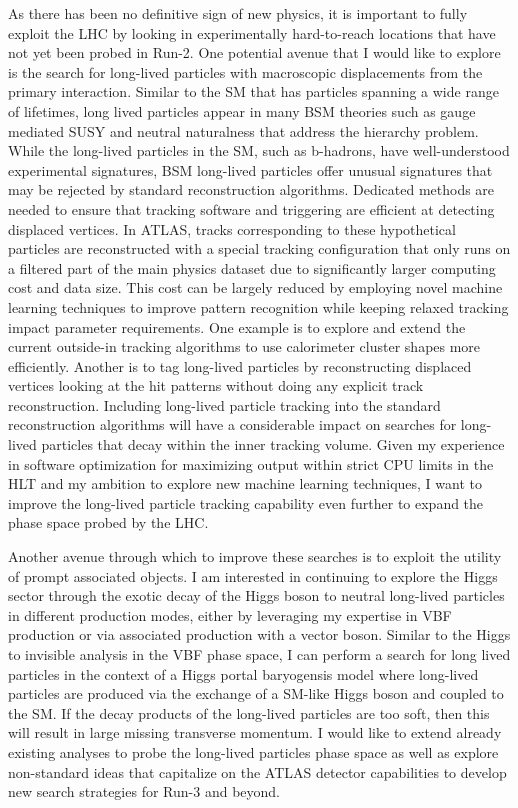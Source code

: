 \documentclass[a4paper]{article}
\begin{document}
As there has been no definitive sign of new physics, it is important to fully exploit the LHC by looking in experimentally hard-to-reach locations that have not yet been probed in Run-2. One potential avenue that I would like to explore is the search for long-lived particles with macroscopic displacements from the primary interaction. Similar to the SM that has particles spanning a wide range of lifetimes, long lived particles appear in many BSM theories such as gauge mediated SUSY and neutral naturalness that address the hierarchy problem\cite{alimena2019searching}. While the long-lived particles in the SM, such as b-hadrons, have well-understood experimental signatures, BSM long-lived particles offer unusual signatures that may be rejected by standard reconstruction algorithms. Dedicated methods are needed to ensure that tracking software and triggering are efficient at detecting displaced vertices. In ATLAS, tracks corresponding to these hypothetical particles are reconstructed with a special tracking configuration that only runs on a filtered part of the main physics dataset due to significantly larger computing cost and data size. This cost can be largely reduced by employing novel machine learning techniques to improve pattern recognition while keeping relaxed tracking impact parameter requirements. One example is to explore and extend the current outside-in tracking algorithms to use calorimeter cluster shapes more efficiently. Another is to tag long-lived particles by reconstructing displaced vertices looking at the hit patterns without doing any explicit track reconstruction. Including long-lived particle tracking into the standard reconstruction algorithms will have a considerable impact on searches for long-lived particles that decay within the inner tracking volume. Given my experience in software optimization for maximizing output within strict CPU limits in the HLT and my ambition to explore new machine learning techniques, I want to improve the long-lived particle tracking capability even further to expand the phase space probed by the LHC.




\bigskip


Another avenue through which to improve these searches is to exploit the utility of prompt associated objects. I am interested in continuing to explore the Higgs sector through the exotic decay of the Higgs boson to neutral long-lived particles in different production modes, either by leveraging my expertise in VBF production or via associated production with a vector boson. Similar to the Higgs to invisible analysis in the VBF phase space, I can perform a search for long lived particles in the context of a Higgs portal baryogensis model where long-lived particles are produced via the exchange of a SM-like Higgs boson and coupled to the SM. If the decay products of the long-lived particles are too soft, then this will result in large missing transverse momentum. I would like to extend already existing analyses to probe the long-lived particles phase space as well as explore non-standard ideas that capitalize on the ATLAS detector capabilities to develop new search strategies for Run-3 and beyond.
\end{document}
